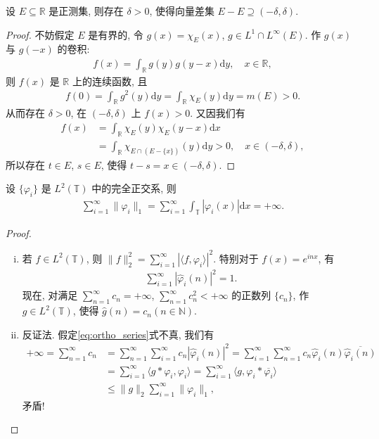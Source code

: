 \documentclass[../../main.tex]{subfiles}%
\begin{document}
\begin{example}
设 $E\subseteq \mathbb{R}$ 是正测集, 则存在 $\delta>0$, 使得向量差集 $E-E\supseteq (-\delta,\delta)$.
\end{example}
\begin{proof}

不妨假定 $E$ 是有界的, 令 $g(x)=\chi_E(x)$, $g\in L^1\cap L^\infty(E)$. 作 $g(x)$ 与 $g(-x)$ 的卷积:
\begin{align*}
f(x) = \int_{\mathbb{R}} g(y) g(y-x) \mathrm{d}y, \quad x\in \mathbb{R},
\end{align*}
则 $f(x)$ 是 $\mathbb{R}$ 上的连续函数, 且
\begin{align*}
f(0) = \int_{\mathbb{R}} g^2(y) \mathrm{d}y = \int_{\mathbb{R}} \chi_E(y) \mathrm{d}y = m(E) > 0.
\end{align*}
从而存在 $\delta>0$, 在 $(-\delta,\delta)$ 上 $f(x)>0$. 又因我们有
\begin{align*}
f(x) &= \int_{\mathbb{R}} \chi_E(y) \chi_E(y-x) \mathrm{d}x \\
&= \int_{\mathbb{R}} \chi_{E\cap (E-\{x\})}(y) \mathrm{d}y > 0, \quad x\in (-\delta,\delta),
\end{align*}
所以存在 $t\in E$, $s\in E$, 使得 $t-s=x\in (-\delta,\delta)$.

\end{proof}

\begin{example}
设 $\{\varphi_i\}$ 是 $L^2(\mathbb{T})$ 中的完全正交系, 则
\begin{align}
\sum\limits_{i=1}^\infty \|\varphi_i\|_1 = \sum\limits_{i=1}^\infty \int_{\mathbb{T}} |\varphi_i(x)| \mathrm{d}x = +\infty.
\label{eq:ortho_series}
\end{align}
\end{example}
\begin{proof}
\begin{enumerate}[(i)]
\item 若 $f\in L^2(\mathbb{T})$, 则 $\|f\|_2^2 = \sum\limits_{i=1}^\infty |\langle f,\varphi_i\rangle|^2$. 特别对于 $f(x)=e^{inx}$, 有
\begin{align*}
\sum\limits_{i=1}^\infty |\hat{\varphi}_i(n)|^2 = 1.
\end{align*}
现在, 对满足 $\sum\limits_{n=1}^\infty c_n=+\infty$, $\sum\limits_{n=1}^\infty c_n^2<+\infty$ 的正数列 $\{c_n\}$, 作 $g\in L^2(\mathbb{T})$, 使得 $\hat{g}(n)=c_n(n\in \mathbb{N})$.

\item 反证法. 假定\eqref{eq:ortho_series}式不真, 我们有
\begin{align*}
+\infty = \sum\limits_{n=1}^\infty c_n &= \sum\limits_{n=1}^\infty \sum\limits_{i=1}^\infty c_n |\hat{\varphi}_i(n)|^2 = \sum\limits_{i=1}^\infty \sum\limits_{n=1}^\infty c_n \hat{\varphi}_i(n) \overline{\hat{\varphi}_i(n)} \\
&= \sum\limits_{i=1}^\infty \langle g*\varphi_i,\varphi_i\rangle = \sum\limits_{i=1}^\infty \langle g,\varphi_i * \overline{\varphi_i}\rangle \\
&\leqslant \|g\|_2 \sum\limits_{i=1}^\infty \|\varphi_i\|_1,
\end{align*}
矛盾!
\end{enumerate}
\end{proof}
\end{document}
